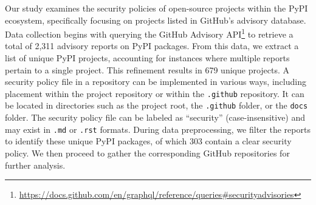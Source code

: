 Our study examines the security policies of open-source projects within the PyPI ecosystem, specifically focusing on projects listed in GitHub’s advisory database. Data collection begins with querying the GitHub Advisory API\footnote{\url{https://docs.github.com/en/graphql/reference/queries\#securityadvisories}}
to retrieve a total of 2,311 advisory reports on PyPI packages. From this data, we extract a list of unique PyPI projects, accounting for instances where multiple reports pertain to a single project. This refinement results in 679 unique projects.
A security policy file in a repository can be implemented in various ways, including placement within the project repository or within the \texttt{.github} repository. It can be located in directories such as the project root, the \texttt{.github} folder, or the \texttt{docs} folder. The security policy file can be labeled as ``security'' (case-insensitive) and may exist in \texttt{.md} or \texttt{.rst} formats. During data preprocessing, we filter the reports to identify these unique PyPI packages, of which 303 contain a clear security policy. We then proceed to gather the corresponding GitHub repositories for further analysis.









